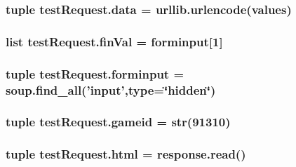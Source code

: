 \hypertarget{namespacetest_request_aa2da30dcafd8fe42c8408aba77c7e70f}{
\subsubsection[{data}]{\setlength{\rightskip}{0pt plus 5cm}tuple test\+Request.\+data = urllib.\+urlencode({\bf values})}}\label{namespacetest_request_aa2da30dcafd8fe42c8408aba77c7e70f}
\hypertarget{namespacetest_request_ac0dc477bbe063b2dc0a1e8fab9086a45}{
\subsubsection[{fin\+Val}]{\setlength{\rightskip}{0pt plus 5cm}list test\+Request.\+fin\+Val = {\bf forminput}\mbox{[}1\mbox{]}}}\label{namespacetest_request_ac0dc477bbe063b2dc0a1e8fab9086a45}
\hypertarget{namespacetest_request_a9dd80d2ee25233da56bf90ee2b6562f8}{
\subsubsection[{forminput}]{\setlength{\rightskip}{0pt plus 5cm}tuple test\+Request.\+forminput = soup.\+find\+\_\+all('input',type=\char`\"{}hidden\char`\"{})}}\label{namespacetest_request_a9dd80d2ee25233da56bf90ee2b6562f8}
\hypertarget{namespacetest_request_ad59cb201aaea659d05de3a976c43d2d0}{
\subsubsection[{gameid}]{\setlength{\rightskip}{0pt plus 5cm}tuple test\+Request.\+gameid = str(91310)}}\label{namespacetest_request_ad59cb201aaea659d05de3a976c43d2d0}
\hypertarget{namespacetest_request_a8f35331152c0a50dcf80c4e88192e928}{
\subsubsection[{html}]{\setlength{\rightskip}{0pt plus 5cm}tuple test\+Request.\+html = response.\+read()}}\label{namespacetest_request_a8f35331152c0a50dcf80c4e88192e928}
